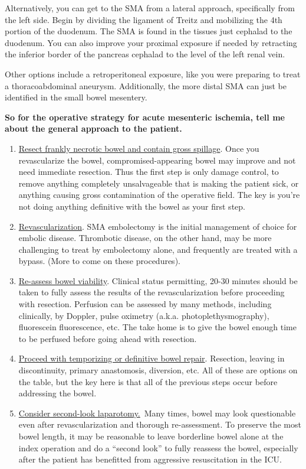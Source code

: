 \documentclass[
]{book}
\begin{document}
Alternatively, you can get to the SMA from a lateral approach,
specifically from the left side. Begin by dividing the ligament of
Treitz and mobilizing the 4th portion of the duodenum. The SMA is found
in the tissues just cephalad to the duodenum. You can also improve your
proximal exposure if needed by retracting the inferior border of the
pancreas cephalad to the level of the left renal vein.

Other options include a retroperitoneal exposure, like you were
preparing to treat a thoracoabdominal aneurysm. Additionally, the more
distal SMA can just be identified in the small bowel mesentery.

\textbf{So for the operative strategy for acute mesenteric ischemia, tell me
about the general approach to the patient.}

\begin{enumerate}
\def\labelenumi{\arabic{enumi}.}
\item
  \uline{Resect frankly necrotic bowel and contain gross
  spillage}. Once you revascularize the bowel,
  compromised-appearing bowel may improve and not need immediate
  resection. Thus the first step is only damage control, to remove
  anything completely unsalvageable that is making the patient sick,
  or anything causing gross contamination of the operative field. The
  key is you're not doing anything definitive with the bowel as your
  first step.
\item
  \uline{Revascularization}. SMA embolectomy is the initial
  management of choice for embolic disease. Thrombotic disease, on the
  other hand, may be more challenging to treat by embolectomy alone,
  and frequently are treated with a bypass. (More to come on these
  procedures).
\item
  \uline{Re-assess bowel viability}. Clinical status permitting,
  20-30 minutes should be taken to fully assess the results of the
  revascularization before proceeding with resection. Perfusion can be
  assessed by many methods, including clinically, by Doppler, pulse
  oximetry (a.k.a. photoplethysmography), fluorescein fluorescence,
  etc. The take home is to give the bowel enough time to be perfused
  before going ahead with resection.
\item
  \uline{Proceed with temporizing or definitive bowel repair}.
  Resection, leaving in discontinuity, primary anastomosis, diversion,
  etc. All of these are options on the table, but the key here is that
  all of the previous steps occur before addressing the bowel.~
\item
  \uline{Consider second-look laparotomy.}~Many times, bowel may
  look questionable even after revascularization and thorough
  re-assessment. To preserve the most bowel length, it may be
  reasonable to leave borderline bowel alone at the index operation
  and do a ``second look'' to fully reassess the bowel, especially after
  the patient has benefitted from aggressive resuscitation in the ICU.
\end{enumerate}
\end{document}
